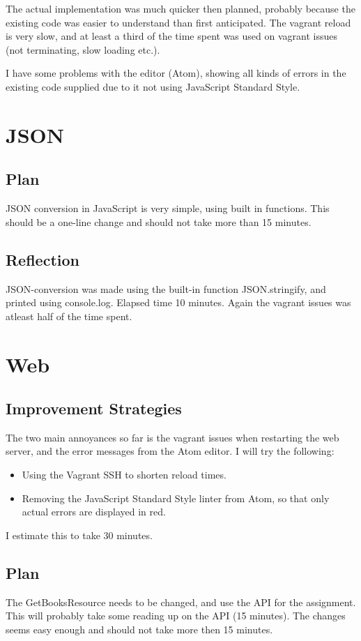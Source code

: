 \documentclass[fleqn,a4paper,11pt]{article}
\begin{document}
The actual implementation was much quicker then planned, probably because the existing code was easier to understand than first anticipated. The vagrant reload is very slow, and at least a third of the time spent was used on vagrant issues (not terminating, slow loading etc.).

I have some problems with the editor (Atom), showing all kinds of errors in the existing code supplied due to it not using JavaScript Standard Style.

\section{JSON}
\subsection{Plan}
JSON conversion in JavaScript is very simple, using built in functions. This should be a one-line change and should not take more than 15 minutes.

\subsection{Reflection}
JSON-conversion was made using the built-in function JSON.stringify, and printed using console.log. Elapsed time 10 minutes. Again the vagrant issues was atleast half of the time spent.

\section{Web}
\subsection{Improvement Strategies}
The two main annoyances so far is the vagrant issues when restarting the web server, and the error messages from the Atom editor. I will try the following:
\begin{itemize}
  \item Using the Vagrant SSH to shorten reload times.
  \item Removing the JavaScript Standard Style linter from Atom, so that only actual errors are displayed in red.
\end{itemize}
I estimate this to take 30 minutes.

\subsection{Plan}
The GetBooksResource needs to be changed, and use the API for the assignment. This will probably take some reading up on the API (15 minutes). The changes seems easy enough and should not take more then 15 minutes.
\end{document}
